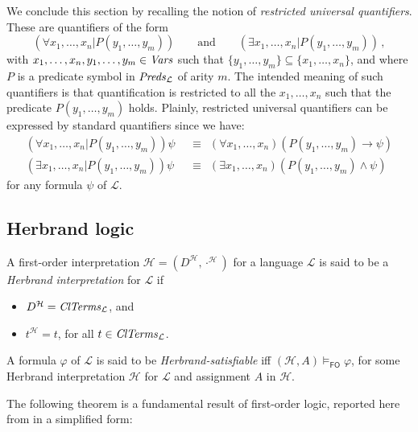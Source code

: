 \documentclass[manyauthors]{fundam}
\newcommand{\Lang}{\ensuremath{\mathcal{L}\xspace}} %
\newcommand{\LangPreds}{\Preds_{\Lang}}
\newcommand{\LangClTerms}{\ClTerms_{\Lang}}
\newcommand{\hinter}{\ensuremath{\mathcal{H}}}
\newcommand{\fomodels}[2]{#1 \models_{\mathsf{FO}} #2}
\begin{document}
We conclude this section by recalling the notion of \emph{restricted 
universal quantifiers}. These are quantifiers of the form
\[
  (\forall x_1, \ldots, x_n | P(y_1, \ldots, y_m)) \qquad \text{and} 
\qquad (\exists x_1, \ldots, x_n | P(y_1, \ldots, y_m))\,,
\]
with $x_1, \ldots, x_n, y_1, \ldots, y_m \in \mathit{Vars}$ such that
$\{y_1, \ldots, y_m\}\subseteq\{x_1, \ldots, x_n\}$,
and where $P$ is a predicate symbol in $\LangPreds$ of arity $m$.
%
The intended meaning of such quantifiers is that
quantification is restricted to all the $x_1, \ldots, x_n$ such that 
the predicate $P(y_1, \ldots, y_m)$ holds.
Plainly, restricted universal quantifiers can be expressed by 
standard quantifiers since we have:
\begin{align*}
(\forall x_1, \ldots, x_n | P(y_1, \ldots, y_m))\psi &~~\equiv~~
  (\forall x_1, \ldots, x_n)(P(y_1, \ldots, y_m)  \rightarrow \psi) \\
%
(\exists x_1, \ldots, x_n | P(y_1, \ldots, y_m))\psi &~~\equiv~~
  (\exists x_1, \ldots, x_n)(P(y_1, \ldots, y_m)  \wedge \psi)
\end{align*}
for any formula $\psi$ of $\Lang$.

\subsection{Herbrand logic}

A first-order interpretation $\hinter=(D^{\hinter},\cdot^\hinter)$
for a language $\Lang$
is said to be a \emph{Herbrand interpretation} for $\Lang$ if
\begin{itemize}
\item $D^{\hinter} = \LangClTerms$, and

\item $t^{\hinter} = t$,  for all $t \in \LangClTerms$.
\end{itemize}
A formula $\varphi$ of $\Lang$ is said to be
\emph{Herbrand-satisfiable} iff
$\fomodels{(\hinter,A)}{\varphi}$, for some Herbrand interpretation 
$\hinter$ for $\Lang$ and assignment $A$ in $\hinter$.

The following theorem is a fundamental result of first-order
logic, reported here from \cite[Theorem 5.9.4]{Fitting96}
in a simplified form:
\end{document}
